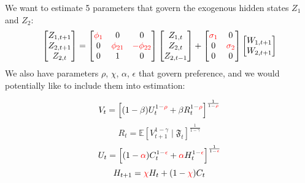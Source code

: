 \documentclass[12pt]{article}
\theoremstyle{definition}
\theoremstyle{remark}
\begin{document}
We want to estimate 5 parameters that govern the exogenous hidden states $Z_1$ and $Z_2$:
\begin{equation*}
\begin{bmatrix}Z_{1,t+1}\\Z_{2,t+1}\\Z_{2,t}\end{bmatrix} = \begin{bmatrix}{\color{red}\phi_1} & 0 & 0 \\0 & {\color{red}\phi_{21}} & {\color{red}-\phi_{22}}\\ 0 & 1 & 0\end{bmatrix} \begin{bmatrix}Z_{1,t}\\Z_{2,t}\\Z_{2,t-1}\end{bmatrix} + \begin{bmatrix}{\color{red}\sigma_1} & 0 \\0 & {\color{red}\sigma_2} \\ 0 & 0\end{bmatrix} \begin{bmatrix} W_{1,t+1}\\ W_{2,t+1}\end{bmatrix}
\end{equation*}
We also have parameters $\rho$, $\chi$, $\alpha$, $\epsilon$ that govern preference, and we would potentially like to include them into estimation:

\begin{equation*}
V_t = \left[(1-\beta)U_t^{1-{\color{red}\rho}}+\beta R_t^{1-{\color{red}\rho}}\right]^{\frac{1}{1-{\color{red}\rho}}}
\end{equation*}
\begin{equation*}
R_t = \mathbb{E}\left[V_{t+1}^{1-\gamma} \mid {\mathfrak F}_t\right]^{\frac{1}{1-\gamma}}
\end{equation*}
\begin{equation*}
U_t = \left[(1-{\color{red}\alpha})C_t^{1-{\color{red}\epsilon}}+{\color{red}\alpha} H_t^{1-{\color{red}\epsilon}}\right]^{\frac{1}{1-{\color{red}\epsilon}}}
\end{equation*}
\begin{equation*}
H_{t+1}  = {\color{red}\chi} H_t + (1-{\color{red}\chi}) C_t
\end{equation*}
\end{document}
